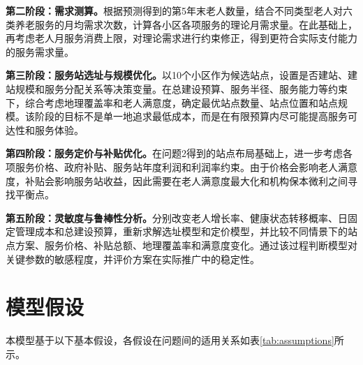 \documentclass[UTF8]{ctexart}
\begin{document}
\textbf{第二阶段：需求测算。}根据预测得到的第5年末老人数量，结合不同类型老人对六类养老服务的月均需求次数，计算各小区各项服务的理论月需求量。在此基础上，再考虑老人月服务消费上限，对理论需求进行约束修正，得到更符合实际支付能力的服务需求量。

\textbf{第三阶段：服务站选址与规模优化。}以10个小区作为候选站点，设置是否建站、建站规模和服务分配关系等决策变量。在总建设预算、服务半径、服务能力等约束下，综合考虑地理覆盖率和老人满意度，确定最优站点数量、站点位置和站点规模。该阶段的目标不是单一地追求最低成本，而是在有限预算内尽可能提高服务可达性和服务体验。

\textbf{第四阶段：服务定价与补贴优化。}在问题2得到的站点布局基础上，进一步考虑各项服务价格、政府补贴、服务站年度利润和利润率约束。由于价格会影响老人满意度，补贴会影响服务站收益，因此需要在老人满意度最大化和机构保本微利之间寻找平衡点。

\textbf{第五阶段：灵敏度与鲁棒性分析。}分别改变老人增长率、健康状态转移概率、日固定管理成本和总建设预算，重新求解选址模型和定价模型，并比较不同情景下的站点方案、服务价格、补贴总额、地理覆盖率和满意度变化。通过该过程判断模型对关键参数的敏感程度，并评价方案在实际推广中的稳定性。

\section{模型假设}

本模型基于以下基本假设，各假设在问题间的适用关系如表\ref{tab:assumptions}所示。
\end{document}
